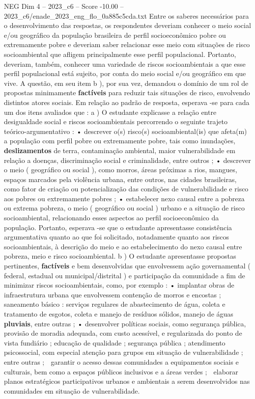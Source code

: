 \begin{textsample}{NEG Dim 4 – 2023\_c6 – Score -10.00 – 2023\_c6/enade\_2023\_eng\_flo\_0a885c5cda.txt}
Entre os saberes necessários para o desenvolvimento das respostas, os respondentes deveriam conhecer o meio social e/ou geográfico da população brasileira de perfil socioeconômico pobre ou extremamente pobre e deveriam saber relacionar esse meio com situações de risco socioambiental que afligem principalmente esse perfil populacional.
Portanto, deveriam, também, conhecer uma variedade de riscos socioambientais a que esse perfil populacional está sujeito, por conta do meio social e/ou geográfico em que vive.
A questão, em seu item b ), por sua vez, demandou o domínio de um rol de propostas minimamente \textbf{factíveis} para reduzir tais situações de risco, envolvendo distintos atores sociais.
Em relação ao padrão de resposta, esperava -se para cada um dos itens avaliados que : a ) O estudante explicasse a relação entre desigualdade social e riscos socioambientais percorrendo o seguinte trajeto teórico-argumentativo : • descrever o(s) risco(s) socioambiental(is) que afeta(m) a população com perfil pobre ou extremamente pobre, tais como inundações, \textbf{deslizamentos} de terra, contaminação ambiental, maior vulnerabilidade em relação a doenças, discriminação social e criminalidade, entre outros ; • descrever o meio ( geográfico ou social ), como morros, áreas próximas a rios, mangues, espaços marcados pela violência urbana, entre outros, nas cidades brasileiras, como fator de criação ou potencialização das condições de vulnerabilidade e risco aos pobres ou extremamente pobres ; • estabelecer nexo causal entre a pobreza ou extrema pobreza, o meio ( geográfico ou social ) urbano e a situação de risco socioambiental, relacionando esses aspectos ao perfil socioeconômico da população.
Portanto, esperava -se que o estudante apresentasse consistência argumentativa quanto ao que foi solicitado, notadamente quanto aos riscos socioambientais, à descrição do meio e ao estabelecimento do nexo causal entre pobreza, meio e risco socioambiental. b ) O estudante apresentasse propostas pertinentes, \textbf{factíveis} e bem desenvolvidas que envolvessem ação governamental ( federal, estadual ou municipal/distrital ) e participação da comunidade a fim de minimizar riscos socioambientais, como, por exemplo : • implantar obras de infraestrutura urbana que envolvessem contenção de morros e encostas ; saneamento básico : serviços regulares de abastecimento de água, coleta e tratamento de esgotos, coleta e manejo de resíduos sólidos, manejo de águas \textbf{pluviais}, entre outras ; • desenvolver políticas sociais, como segurança pública, provisão de moradia adequada, com custo acessível, e regularizada do ponto de vista fundiário ; educação de qualidade ; segurança pública ; atendimento psicossocial, com especial atenção para grupos em situação de vulnerabilidade ; entre outras ;  garantir o acesso dessas comunidades a equipamentos sociais e culturais, bem como a espaços públicos inclusivos e a áreas verdes ;  elaborar planos estratégicos participativos urbanos e ambientais a serem desenvolvidos nas comunidades em situação de vulnerabilidade.

\end{textsample}
